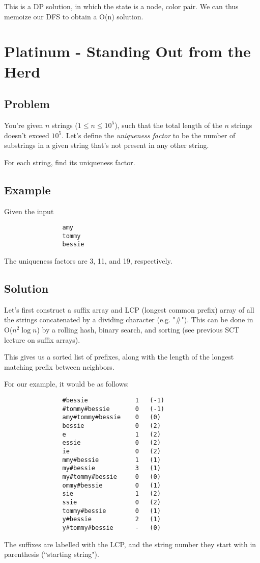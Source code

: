 \documentclass[11pt]{article}
\begin{document}
        This is a DP solution, in which the state is a node, color pair. We can thus memoize our DFS to obtain a O(n) solution.
        
\section{Platinum - Standing Out from the Herd}
        \subsection{Problem}
            You're given $n$ strings ($1 \leq n \leq 10^5$), such that the total length of the $n$ strings doesn't exceed $10^5$. Let's define the \textit{uniqueness factor} to be the number of substrings in a given string that's not present in any other string. 
            
            For each string, find its uniqueness factor.
        
        \subsection{Example}
        Given the input
            \begin{verbatim}
                amy
                tommy
                bessie
            \end{verbatim}
        The uniqueness factors are 3, 11, and 19, respectively.
        
        \subsection{Solution}
            Let's first construct a suffix array and LCP (longest common prefix) array of all the strings concatenated by a dividing character (e.g. "\#"). This can be done in O($n^2 \log n$) by a rolling hash, binary search, and sorting (see previous SCT lecture on suffix arrays).
            
            This gives us a sorted list of prefixes, along with the length of the longest matching prefix between neighbors.
            
            For our example, it would be as follows:
            \begin{verbatim}
                #bessie             1   (-1)
                #tommy#bessie       0   (-1)
                amy#tommy#bessie    0   (0)
                bessie              0   (2)
                e                   1   (2)
                essie               0   (2)
                ie                  0   (2)
                mmy#bessie          1   (1)
                my#bessie           3   (1)
                my#tommy#bessie     0   (0)
                ommy#bessie         0   (1)
                sie                 1   (2)
                ssie                0   (2)
                tommy#bessie        0   (1)
                y#bessie            2   (1)
                y#tommy#bessie      -   (0)
            \end{verbatim}
            The suffixes are labelled with the LCP, and the string number they start with in parenthesis (``starting string").
            
\end{document}
